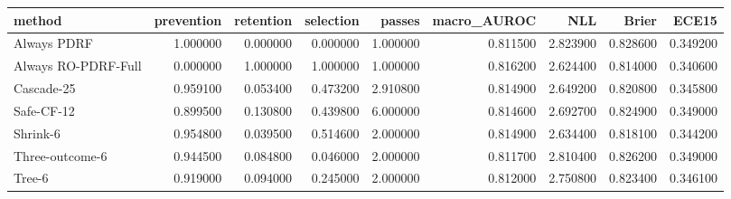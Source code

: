 \begin{tabular}{lrrrrrrrr}
\toprule
method & prevention & retention & selection & passes & macro_AUROC & NLL & Brier & ECE15 \\
\midrule
Always PDRF & 1.000000 & 0.000000 & 0.000000 & 1.000000 & 0.811500 & 2.823900 & 0.828600 & 0.349200 \\
Always RO-PDRF-Full & 0.000000 & 1.000000 & 1.000000 & 1.000000 & 0.816200 & 2.624400 & 0.814000 & 0.340600 \\
Cascade-25 & 0.959100 & 0.053400 & 0.473200 & 2.910800 & 0.814900 & 2.649200 & 0.820800 & 0.345800 \\
Safe-CF-12 & 0.899500 & 0.130800 & 0.439800 & 6.000000 & 0.814600 & 2.692700 & 0.824900 & 0.349000 \\
Shrink-6 & 0.954800 & 0.039500 & 0.514600 & 2.000000 & 0.814900 & 2.634400 & 0.818100 & 0.344200 \\
Three-outcome-6 & 0.944500 & 0.084800 & 0.046000 & 2.000000 & 0.811700 & 2.810400 & 0.826200 & 0.349000 \\
Tree-6 & 0.919000 & 0.094000 & 0.245000 & 2.000000 & 0.812000 & 2.750800 & 0.823400 & 0.346100 \\
\bottomrule
\end{tabular}
